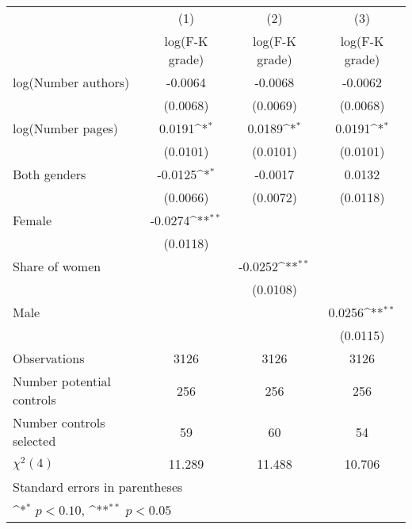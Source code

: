 {
\def\sym#1{\ifmmode^{#1}\else\(^{#1}\)\fi}
\begin{tabular}{l*{3}{c}}
\hline\hline
                    &\multicolumn{1}{c}{(1)}&\multicolumn{1}{c}{(2)}&\multicolumn{1}{c}{(3)}\\
                    &\multicolumn{1}{c}{log(F-K grade)}&\multicolumn{1}{c}{log(F-K grade)}&\multicolumn{1}{c}{log(F-K grade)}\\
\hline
\hspace{3mm}log(Number authors)&     -0.0064        &     -0.0068        &     -0.0062        \\
                    &    (0.0068)        &    (0.0069)        &    (0.0068)        \\
[1em]
\hspace{3mm}log(Number pages)&      0.0191\sym{*} &      0.0189\sym{*} &      0.0191\sym{*} \\
                    &    (0.0101)        &    (0.0101)        &    (0.0101)        \\
[1em]
\hspace{3mm}Both genders&     -0.0125\sym{*} &     -0.0017        &      0.0132        \\
                    &    (0.0066)        &    (0.0072)        &    (0.0118)        \\
[1em]
\hspace{3mm}Female  &     -0.0274\sym{**}&                    &                    \\
                    &    (0.0118)        &                    &                    \\
[1em]
\hspace{3mm}Share of women&                    &     -0.0252\sym{**}&                    \\
                    &                    &    (0.0108)        &                    \\
[1em]
\hspace{3mm}Male    &                    &                    &      0.0256\sym{**}\\
                    &                    &                    &    (0.0115)        \\
\hline
Observations        &        3126        &        3126        &        3126        \\
Number potential controls&         256        &         256        &         256        \\
Number controls selected&          59        &          60        &          54        \\
$\chi^2(4)$         &      11.289        &      11.488        &      10.706        \\
\hline\hline
\multicolumn{4}{l}{\footnotesize Standard errors in parentheses}\\
\multicolumn{4}{l}{\footnotesize \sym{*} \(p<0.10\), \sym{**} \(p<0.05\)}\\
\end{tabular}
}
